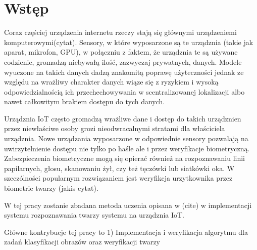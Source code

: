 \newpage
\section[Wstęp]{Wstęp}

Coraz częściej urządzenia internetu rzeczy stają się głównymi urządzeniemi komputerowymi(cytat).
Sensory, w które wyposarzone są te urządznia (takie jak aparat, mikrofon, GPU), w połączniu z
faktem, że urządznia te są używane codzienie, gromadzą niebywałą ilość, zazwyczaj prywatnych,
danych. Modele wyuczone na takich danych dadzą znakomitą poprawę użyteczności jednak ze względu
na wrażliwy charakter danych wiąze się z ryzykiem i wysoką odpowiedzialnością ich
przechechowywania w scentralizowanej lokalizacji albo nawet całkowitym brakiem dostępu do tych
danych.




Urządznia IoT często gromadzą wrażliwe dane i dostęp do takich urządznien przez niewłaściwe osoby
grozi nieodwracalnymi stratami dla właściciela urządznia. Nowe urządzania wyposarzone w
odpowiednie sensory pozwalają na uwirzytelnienie dostępu nie tylko po haśle ale i przez
weryfikacje biometryczną. Zabezpieczenia biometryczne mogą się opierać również na rozpoznawaniu
linii papilarnych, głosu, skanowaniu żył, czy też tęczówki lub siatkówki oka. W szeczólności
popularnym rozwiązaniem jest weryfikcja urzytkownika przez biometrie twarzy (jakis cytat).

W tej pracy zostanie zbadana metoda uczenia opisana w (cite) w implementacji systemu
rozpoznawania twarzy systemu na urządznia IoT.


Główne kontrybucje tej pracy to 1) Implementacja i weryfikacja algorytmu \fedavglong dla zadań klasyfikacji obrazów oraz weryfikacji twarzy
